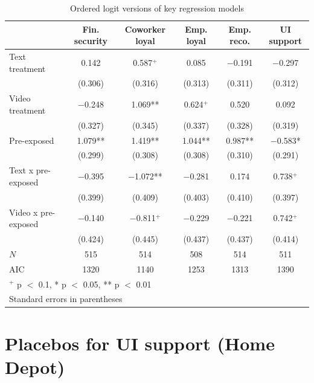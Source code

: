 \documentclass[
  11pt,
  oneside]{article}
\begin{document}
\begin{table}
\centering
\caption{\label{tab:tab-app-ol}Ordered logit versions of key regression models \label{tab:tab-app-ol}}
\centering
\begin{tabular}[t]{lccccc}
\toprule
  & Fin. security & Coworker loyal & Emp. loyal & Emp. reco. & UI support\\
\midrule
Text treatment & \num{0.142} & \num{0.587}$^+$ & \num{0.085} & \num{-0.191} & \num{-0.297}\\
 & (\num{0.306}) & (\num{0.316}) & (\num{0.313}) & (\num{0.311}) & (\num{0.312})\\
Video treatment & \num{-0.248} & \num{1.069}** & \num{0.624}$^+$ & \num{0.520} & \num{0.092}\\
 & (\num{0.327}) & (\num{0.345}) & (\num{0.337}) & (\num{0.328}) & (\num{0.319})\\
Pre-exposed & \num{1.079}** & \num{1.419}** & \num{1.044}** & \num{0.987}** & \num{-0.583}*\\
 & (\num{0.299}) & (\num{0.308}) & (\num{0.308}) & (\num{0.310}) & (\num{0.291})\\
Text x pre-exposed & \num{-0.395} & \num{-1.072}** & \num{-0.281} & \num{0.174} & \num{0.738}$^+$\\
 & (\num{0.399}) & (\num{0.409}) & (\num{0.403}) & (\num{0.410}) & (\num{0.397})\\
Video x pre-exposed & \num{-0.140} & \num{-0.811}$^+$ & \num{-0.229} & \num{-0.221} & \num{0.742}$^+$\\
 & (\num{0.424}) & (\num{0.445}) & (\num{0.437}) & (\num{0.437}) & (\num{0.414})\\
\midrule
$N$ & \num{515} & \num{514} & \num{508} & \num{514} & \num{511}\\
AIC & \num{1320} & \num{1140} & \num{1253} & \num{1313} & \num{1390}\\
\bottomrule
\multicolumn{6}{l}{\rule{0pt}{1em}$^+$ p $<$ 0.1, * p $<$ 0.05, ** p $<$ 0.01}\\
\multicolumn{6}{l}{\rule{0pt}{1em}Standard errors in parentheses}\\
\end{tabular}
\end{table}

\newpage

\section{Placebos for UI support (Home Depot)}\label{app-placebo}
\end{document}
